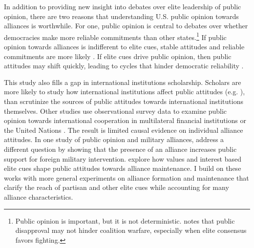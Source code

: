 \documentclass[12pt]{article}
\begin{document}
In addition to providing new insight into debates over elite leadership of public opinion, there are two reasons that understanding U.S. public opinion towards alliances is worthwhile. 
For one, public opinion is central to debates over whether democracies make more reliable commitments than other states.\footnote{Public opinion is important, but it is not deterministic. \citet{Kreps2010} notes that public disapproval may not hinder coalition warfare, especially when elite consensus favors fighting.} 
If public opinion towards alliances is indifferent to elite cues, stable attitudes and reliable commitments are more likely \citep{Gaubatz1996}.
If elite cues drive public opinion, then public attitudes may shift quickly, leading to cycles that hinder democratic reliability \citep{GartzkeGleditsch2004}.




This study also fills a gap in international institutions scholarship. 
Scholars are more likely to study how international institutions affect public attitudes (e.g. \citep{KayaWalker2014, Greenhill2020}), than scrutinize the sources of public attitudes towards international institutions themselves. 
Other studies use observational survey data to examine public opinion towards international cooperation in multilateral financial institutions \citep{Edwards2009} or the United Nations \citep{Torgler2008, DellmuthTallberg2015}. 
The result is limited causal evidence on individual alliance attitudes.
In one study of public opinion and military alliances, \citet{TomzWeeks2021} address a different question by showing that the presence of an alliance increases public support for foreign military intervention. 
\citet{Chuetal2021} explore how values and interest based elite cues shape public attitudes towards alliance maintenance. 
I build on these works with more general experiments on alliance formation and maintenance that clarify the reach of partisan and other elite cues while accounting for many alliance characteristics. 
\end{document}
